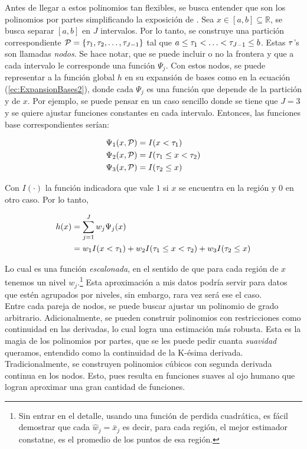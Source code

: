 \documentclass[../Main/Main.tex]{subfiles}
\begin{document}
Antes de llegar a estos polinomios tan flexibles, se busca entender que son los polinomios por partes simplificando la exposición de \autocite{wahba1990splines}. Sea $x\in[a,b]\subseteq\mathbb{R}$, se busca separar $[a,b]$ en $J$ intervalos. Por lo tanto, se construye una partición correspondiente $\mathcal{P} = \left\{\tau_1,  \tau_2,\ldots,  \tau_{J-1} \right\}$ tal que $a \leq  \tau_1 < \ldots <  \tau_{J-1} \leq b$. Estas $ \tau$'s son llamadas \textit{nodos}. Se hace notar, que se puede incluir o no la frontera y que a cada intervalo le corresponde una función $\Psi_j$. Con estos nodos, se puede representar a la función global $h$ en su expansión de bases como en la ecuación (\ref{ec:ExpansionBases2}), donde cada $\Psi_j$ es una función que depende de la partición y de $x$. Por ejemplo, se puede pensar en un caso sencillo donde se tiene que $J = 3$ y se quiere ajustar funciones constantes en cada intervalo. Entonces, las funciones base correspondientes serían:

\begin{align*}
	\Psi_1(x,\mathcal{P}) &= I( x <  \tau_1) \\
	\Psi_2(x,\mathcal{P}) &= I( \tau_1 \leq x <  \tau_2) \\
	\Psi_3(x,\mathcal{P}) &= I( \tau_2 \leq x ) 
\end{align*}

Con $I(\cdot)$ la función indicadora que vale $1$ si $x$ se encuentra en la región y $0$ en otro caso. Por lo tanto, 

\begin{align*}
		h(x) &= \sum_{j = 1}^J w_j\Psi_j(x) \\
			 &= w_1 I( x <  \tau_1) + w_2 I( \tau_1 \leq x <  \tau_2) + w_3 I( \tau_2 \leq x)
\end{align*}

Lo cual es una función \textit{escalonada}, en el sentido de que para cada región de $x$ tenemos un nivel $w_j$.\footnote{Sin entrar en el detalle, usando una función de perdida cuadrática, es fácil demostrar que cada $\hat{w}_j = \bar{x}_j$ es decir, para cada región, el mejor estimador constatne, es el promedio de los puntos de esa región.} Esta aproximación a mis datos podría servir para datos que estén agrupados por niveles, sin embargo, rara vez será ese el caso.\\

Entre cada pareja de nodos, se puede buscar ajustar un polinomio de grado arbitrario. Adicionalmente, se pueden construir polinomios con  restricciones como continuidad en las derivadas, lo cual logra una estimación más robusta. Esta es la magia de los polinomios por partes, que se les puede pedir cuanta \textit{suavidad} queramos, entendido como la continuidad de la K-ésima derivada. Tradicionalmente, se construyen polinomios cúbicos con segunda derivada continua en los nodos. Esto, pues resulta en funciones suaves al ojo humano que logran aproximar una gran cantidad de funciones.
\end{document}
